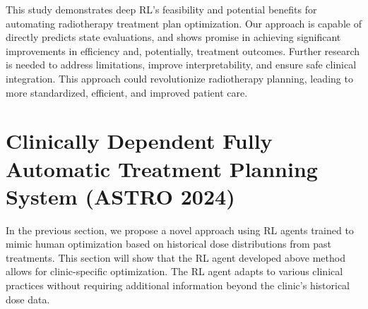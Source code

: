 This study demonstrates deep RL's feasibility and potential benefits for automating radiotherapy treatment plan optimization.
Our approach is capable of directly predicts state evaluations, and shows promise in achieving significant improvements in efficiency and, potentially, treatment outcomes.
Further research is needed to address limitations, improve interpretability, and ensure safe clinical integration.
This approach could revolutionize radiotherapy planning, leading to more standardized, efficient, and improved patient care.






\section{Clinically Dependent Fully Automatic Treatment Planning System (ASTRO 2024)}
In the previous section, we propose a novel approach using RL agents trained to mimic human optimization based on historical dose distributions from past treatments.
This section will show that the RL agent developed above method allows for clinic-specific optimization.
The RL agent adapts to various clinical practices without requiring additional information beyond the clinic's historical dose data.


